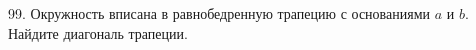 99. Окружность вписана в равнобедренную трапецию с основаниями  $a$ и $b.$ Найдите диагональ трапеции.\\
